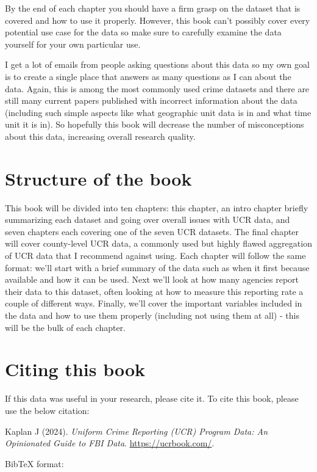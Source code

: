 \documentclass[
]{krantz}
\begin{document}
By the end of each chapter you should have a firm grasp on
the dataset that is covered and how to use it properly.
However, this book can't possibly cover every potential use
case for the data so make sure to carefully examine the data
yourself for your own particular use.

I get a lot of emails from people asking questions about
this data so my own goal is to create a single place that
answers as many questions as I can about the data. Again,
this is among the most commonly used crime datasets and
there are still many current papers published with incorrect
information about the data (including such simple aspects
like what geographic unit data is in and what time unit it
is in). So hopefully this book will decrease the number of
misconceptions about this data, increasing overall research
quality.

\section{Structure of the book}\label{structure-of-the-book}

This book will be divided into ten chapters: this chapter,
an intro chapter briefly summarizing each dataset and going
over overall issues with UCR data, and seven chapters each
covering one of the seven UCR datasets. The final chapter
will cover county-level UCR data, a commonly used but highly
flawed aggregation of UCR data that I recommend against
using. Each chapter will follow the same format: we'll start
with a brief summary of the data such as when it first
because available and how it can be used. Next we'll look at
how many agencies report their data to this dataset, often
looking at how to measure this reporting rate a couple of
different ways. Finally, we'll cover the important variables
included in the data and how to use them properly (including
not using them at all) - this will be the bulk of each
chapter.

\section{Citing this book}\label{citing-this-book}

If this data was useful in your research, please cite it. To
cite this book, please use the below citation:

Kaplan J (2024). \emph{Uniform Crime Reporting (UCR) Program
Data: An Opinionated Guide to FBI Data}.
\url{https://ucrbook.com/}.

BibTeX format:
\end{document}
